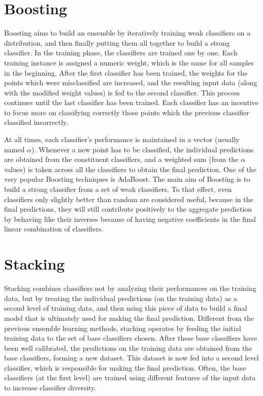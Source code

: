 \section{Boosting}
Boosting aims to build an ensemble by iteratively training weak classifiers on a distribution, and then finally putting them all together to build a strong classifier. In the training phase, the classifiers are trained one by one. Each training instance is assigned a numeric weight, which is the same for all samples in the beginning. After the first classifier has been trained, the weights for the points which were misclassified are increased, and the resulting input data (along with the modified weight values) is fed to the second classifier. This process continues until the last classifier has been trained. Each classifier has an incentive to focus more on classifying correctly those points which the previous classifier classified incorrectly.

At all times, each classifier's performance is maintained in a vector (usually named $\alpha$). Whenever a new point has to be classified, the individual predictions are obtained from the constituent classifiers, and a weighted sum (from the $\alpha$ values) is taken across all the classifiers to obtain the final prediction. One of the very popular Boosting techniques is AdaBoost. The main aim of Boosting is to build a strong classifier from a set of weak classifiers. To that effect, even classifiers only slightly better than random are considered useful, because in the final predictions, they will still contribute positively to the aggregate prediction by behaving like their inverses because of having negative coefficients in the final linear combination of classifiers.

\section{Stacking}
Stacking combines classifiers not by analyzing their performances on the training data, but by treating the individual predictions (on the training data) as a second level of training data, and then using this piece of data to build a final model that is ultimately used for making the final prediction. Different from the previous ensemble learning methods, stacking operates by feeding the initial training data to the set of base classifiers chosen. After these base classifiers have been well calibrated, the predictions on the training data are obtained from the base classifiers, forming a new dataset. This dataset is now fed into a second level classifier, which is responsible for making the final prediction. Often, the base classifiers (at the first level) are trained using different features of the input data to increase classifier diversity.


